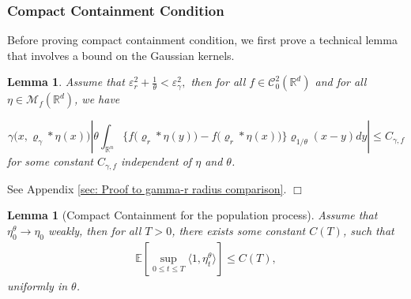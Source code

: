\documentclass[12pt]{article}
\newenvironment {proof}{{\noindent\bf Proof }}{\hfill $\Box$ \medskip}
\newtheorem{lemma}[theorem]{Lemma}
\newcommand{\IE}{\mathbb E}
\begin{document}
\subsubsection{Compact Containment Condition}
Before proving compact containment condition,
we first prove a technical lemma that involves a bound on the Gaussian kernels.
\begin{lemma}
    \label{lem: gamma - r radius comparison}
    Assume that $\varepsilon_{r}^2 + \frac{1}{\theta} < \varepsilon_{\gamma}^2,$ then
    for all $f \in \mathcal{C}^{2}_{0}(\mathbb{R}^d)$
    and for all $\eta \in \mathcal{M}_{f}(\mathbb{R}^d)$, we have 
    
    \begin{equation}\label{eq: gamma - r radius comparison bound}
    \gamma\big(x,\varrho_{\gamma}*\eta(x)\big) \left| \theta \int_{\mathbb{R}^n} \big\{f\big(\varrho_{r}*\eta(y)\big)-f\big(\varrho_{r}*\eta(x)\big)\big\}\varrho_{1/\theta}(x-y)dy\right| \leq C_{\gamma, f}    
    \end{equation}
    for some constant $C_{\gamma,f}$ independent of $\eta$ and $\theta$. 
\end{lemma}
\begin{proof}
See Appendix \ref{sec: Proof to gamma-r radius comparison}.    
\end{proof}
\begin{lemma}[Compact Containment for the population process]
Assume that $\eta^{\theta}_0 \to \eta_0$ weakly,
then for all $T>0$, there exists some constant $C(T)$,
such that
    \begin{align}
        \IE\left[
            \sup_{0 \le t \le T}
            \langle 1, \eta^\theta_t \rangle
        \right]
        \le C(T) ,
    \end{align}
    uniformly in $\theta$.
\end{lemma}
\end{document}
